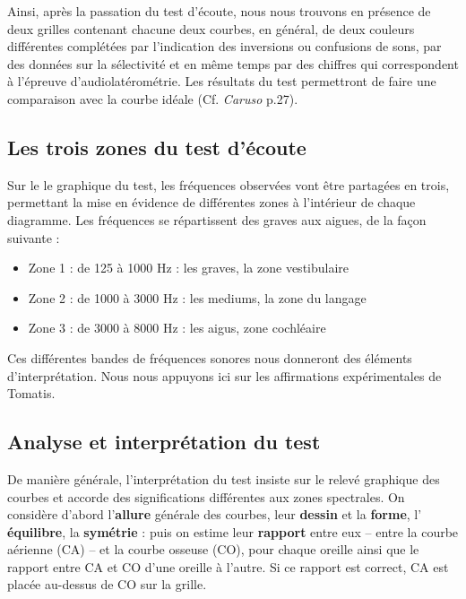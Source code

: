               Ainsi, après la passation du test d\textquoteright écoute, nous nous
trouvons en présence de deux grilles contenant chacune deux courbes,
en général, de deux couleurs différentes complétées par l'indication
des inversions ou confusions de sons, par des données sur la sélectivité
et en même temps par des chiffres qui correspondent à l'épreuve d'audiolatérométrie.
Les résultats du test permettront de faire une comparaison avec la
courbe idéale (Cf.\textit{ Caruso }p.27).


\subsection{Les trois zones du test d'écoute }
Sur le le graphique du test, les fréquences observées vont être partagées en
trois, permettant la mise en évidence de différentes zones à l\textquoteright intérieur
de chaque diagramme. Les fréquences se répartissent des
graves aux aigues, de la façon suivante :
\begin{itemize}
\item Zone 1 : de 125 à 1000 Hz : les graves, la zone vestibulaire
\item Zone 2 : de 1000 à 3000 Hz : les mediums, la zone du langage
\item Zone 3 : de 3000 à 8000 Hz : les aigus, zone cochléaire
\end{itemize}
Ces différentes bandes de fréquences sonores nous donneront des éléments
d'interprétation.
Nous nous appuyons ici sur les affirmations expérimentales de Tomatis.

\subsection {Analyse et interprétation du test}


De manière générale, l'interprétation du test insiste sur le relevé graphique
des
courbes et accorde des
significations différentes aux zones spectrales.
On considère d'abord l'\textbf{allure }générale des courbes, leur
\textbf{dessin} et la \textbf{forme}, l' \textbf{équilibre}, la \textbf{symétrie}  :
puis on estime
leur\textbf{ rapport} entre eux -- entre la courbe aérienne (CA) -- et la courbe osseuse (CO),
pour chaque oreille ainsi que le rapport entre CA et CO d\textquoteright une
oreille à l'autre. Si ce rapport est correct, CA est placée au-dessus
de CO sur la grille.

